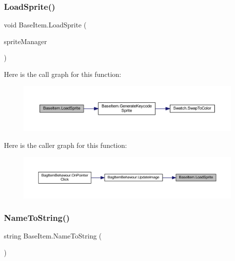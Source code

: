 \subsubsection{\texorpdfstring{LoadSprite()}{LoadSprite()}}
{\footnotesize\ttfamily void Base\+Item.\+Load\+Sprite (\begin{DoxyParamCaption}\item[{\mbox{\hyperlink{class_sprite_manager}{Sprite\+Manager}}}]{sprite\+Manager }\end{DoxyParamCaption})}

Here is the call graph for this function\+:
\nopagebreak
\begin{figure}[H]
\begin{center}
\leavevmode
\includegraphics[width=350pt]{class_base_item_abedb8e41aaa0f3ee702ae8fa678204e2_cgraph}
\end{center}
\end{figure}
Here is the caller graph for this function\+:
\nopagebreak
\begin{figure}[H]
\begin{center}
\leavevmode
\includegraphics[width=350pt]{class_base_item_abedb8e41aaa0f3ee702ae8fa678204e2_icgraph}
\end{center}
\end{figure}
\mbox{\label{class_base_item_a837fa537092e144e95b353e3f1ffaeb6}} 
\subsubsection{\texorpdfstring{NameToString()}{NameToString()}}
{\footnotesize\ttfamily string Base\+Item.\+Name\+To\+String (\begin{DoxyParamCaption}{ }\end{DoxyParamCaption})}

